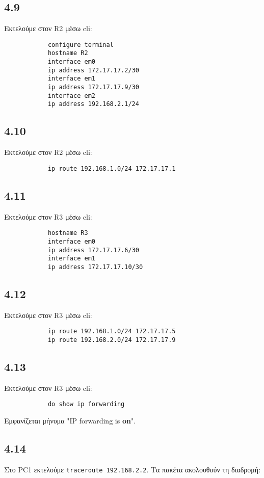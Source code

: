 \documentclass[a4paper, 12pt]{article}
\begin{document}
	\subsection*{4.9}
		Εκτελούμε στον R2 μέσω cli:
		
		\begin{verbatim}
			configure terminal
			hostname R2
			interface em0
			ip address 172.17.17.2/30
			interface em1
			ip address 172.17.17.9/30
			interface em2
			ip address 192.168.2.1/24
		\end{verbatim}

	\subsection*{4.10}
		Εκτελούμε στον R2 μέσω cli:
		
		\begin{verbatim}
			ip route 192.168.1.0/24 172.17.17.1
		\end{verbatim}

	\subsection*{4.11}		
		Εκτελούμε στον R3 μέσω cli:
		
		\begin{verbatim}
			hostname R3
			interface em0
			ip address 172.17.17.6/30
			interface em1
			ip address 172.17.17.10/30
		\end{verbatim}

	\subsection*{4.12}
		Εκτελούμε στον R3 μέσω cli:
		
		\begin{verbatim}
			ip route 192.168.1.0/24 172.17.17.5
			ip route 192.168.2.0/24 172.17.17.9
		\end{verbatim}

	\subsection*{4.13}
		Εκτελούμε στον R3 μέσω cli:
		
		\begin{verbatim}
			do show ip forwarding
		\end{verbatim}
		
		Εμφανίζεται μήνυμα "IP forwarding is \textbf{on}".

	\subsection*{4.14}
		Στο PC1 εκτελούμε \verb|traceroute 192.168.2.2|. Τα πακέτα ακολουθούν τη διαδρομή: \\
		
\end{document}
